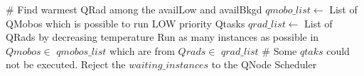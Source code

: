\begin{algorithm}[H]
\begin{algorithmic}[1]
                \ELSE
                    \STATE \# Find warmest QRad among the availLow and availBkgd
                    \STATE $qmobo\_list \leftarrow$ List of QMobos which is possible to run LOW priority Qtasks
                    \STATE $qrad\_list \leftarrow$ List of QRads by decreasing temperature
                    \STATE Run as many instances as possible in $Qmobos \in$ $qmobos\_list$ which are from $Qrads \in$ $qrad\_list$
                \ENDIF
        \ENDFOR
            \STATE \# Some $qtaks$ could not be executed.
            \STATE Reject the $waiting\_instances$ to the QNode Scheduler
        \ENDIF

\begin{comment}
        \STATE $waiting\_instances \leftarrow$ List of instances waiting to be scheduled on this QBox, sorted by priority
        \FOR{$qtask \in$ $waiting\_instances$}
            \STATE $nb\_qtask\_instances \leftarrow$ Number of instances from this $qtask$
            \STATE Transfer the $qtask.data\_sets$
            \IF{$qtask.priority \eq$ HIGH}
                \STATE \# Find coolest QRad which is not running LOW instance
                \STATE $qmobo\_list \leftarrow$ List of QMobos which is possible to run HIGH priority Qtasks
                \STATE $qrad\_list \leftarrow$ List of QRads by decreasing temperature
                \FOR{$qrad \in$ $qrad\_list$}
                    \FOR{$qmobo \in$ $qmobo\_list$}
                        \IF{$qmobo.running\_job\_priority \eq$ BKGD}
                            \STATE Start the instance in this $qmobo$
                            \STATE Update $nb\_qtask\_instances$
                            \IF{$nb\_waiting\_instances \eq$ 0}
                                \STATE return
                            \ENDIF
                        \ELSE
                            \STATE $low\_qmobos \leftarrow$ $low\_qmobos$ + $qmobo$
                        \ENDIF
                    \ENDFOR
                \ENDFOR
                \IF{$nb\_waiting\_instances \eq$ 0}
                    \STATE return
                \ENDIF
                \FOR{$qmobo \in$ $low\_qmobos$}
                    \STATE Start the instance in in this $qmobo$
                    \STATE Update $nb\_qtask\_instances$
                    \IF{$nb\_waiting\_instances \eq$ 0}
                        \STATE return
                    \ENDIF
                \ENDFOR
            \ELSE
                \STATE \# Find warmest QRad among the availLow and availBkgd

\end{comment}
\end{algorithmic}
\end{algorithm}
